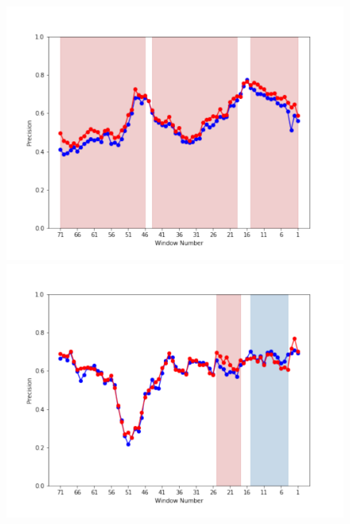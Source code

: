 \documentclass[submit]{ipsj}
\begin{document}
\begin{figure}[t]
\centering
\begin{minipage}[b]{0.65\columnwidth}
    \centering
    \includegraphics[width=1\columnwidth]{Uenaka_fig/RQ2_result/Nova/Nova_review_Precision.pdf}
    \includegraphics[width=1\columnwidth]{Uenaka_fig/RQ2_result/Neutron/Neutron_review_Precision.pdf}
\end{minipage}
\begin{minipage}[b]{0.65\columnwidth}
    \centering

\end{minipage}
\end{figure}
\end{document}
